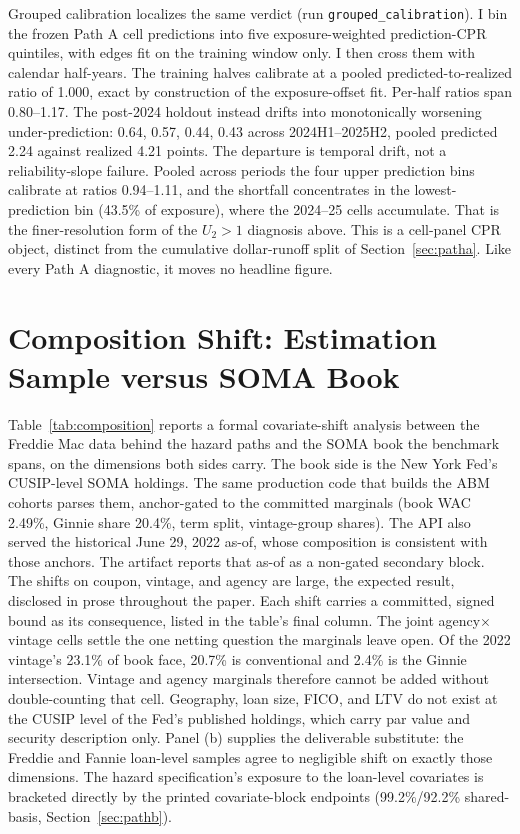 \documentclass[12pt]{article}
\begin{document}
Grouped calibration localizes the same verdict (run \texttt{grouped\_calibration}). I bin the frozen Path A cell predictions into five exposure-weighted prediction-CPR quintiles, with edges fit on the training window only. I then cross them with calendar half-years. The training halves calibrate at a pooled predicted-to-realized ratio of 1.000, exact by construction of the exposure-offset fit. Per-half ratios span 0.80--1.17. The post-2024 holdout instead drifts into monotonically worsening under-prediction: 0.64, 0.57, 0.44, 0.43 across 2024H1--2025H2, pooled predicted 2.24 against realized 4.21 points. The departure is temporal drift, not a reliability-slope failure. Pooled across periods the four upper prediction bins calibrate at ratios 0.94--1.11, and the shortfall concentrates in the lowest-prediction bin (43.5\% of exposure), where the 2024--25 cells accumulate. That is the finer-resolution form of the $U_2 > 1$ diagnosis above. This is a cell-panel CPR object, distinct from the cumulative dollar-runoff split of Section~\ref{sec:patha}. Like every Path A diagnostic, it moves no headline figure.

\section{Composition Shift: Estimation Sample versus SOMA Book}\label{app:composition}

Table~\ref{tab:composition} reports a formal covariate-shift analysis between the Freddie Mac data behind the hazard paths and the SOMA book the benchmark spans, on the dimensions both sides carry. The book side is the New York Fed's CUSIP-level SOMA holdings. The same production code that builds the ABM cohorts parses them, anchor-gated to the committed marginals (book WAC 2.49\%, Ginnie share 20.4\%, term split, vintage-group shares). The API also served the historical June 29, 2022 as-of, whose composition is consistent with those anchors. The artifact reports that as-of as a non-gated secondary block. The shifts on coupon, vintage, and agency are large, the expected result, disclosed in prose throughout the paper. Each shift carries a committed, signed bound as its consequence, listed in the table's final column. The joint agency$\times$vintage cells settle the one netting question the marginals leave open. Of the 2022 vintage's 23.1\% of book face, 20.7\% is conventional and 2.4\% is the Ginnie intersection. Vintage and agency marginals therefore cannot be added without double-counting that cell. Geography, loan size, FICO, and LTV do not exist at the CUSIP level of the Fed's published holdings, which carry par value and security description only. Panel (b) supplies the deliverable substitute: the Freddie and Fannie loan-level samples agree to negligible shift on exactly those dimensions. The hazard specification's exposure to the loan-level covariates is bracketed directly by the printed covariate-block endpoints (99.2\%/92.2\% shared-basis, Section~\ref{sec:pathb}).
\end{document}
